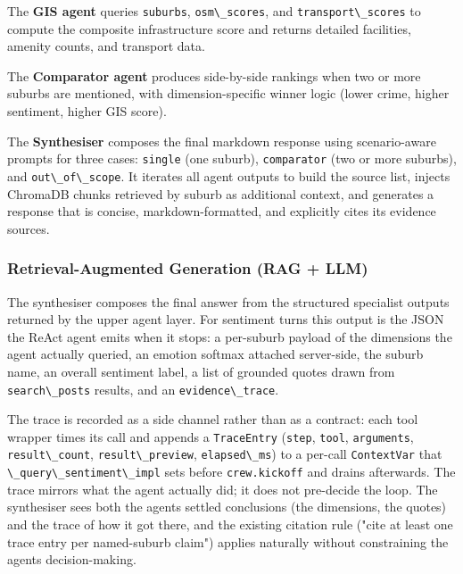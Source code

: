 \documentclass[11pt,a4paper]{article}
\newcommand{\passthrough}[1]{#1}
\begin{document}
The \textbf{GIS agent} queries \passthrough{\lstinline!suburbs!}, \passthrough{\lstinline!osm\_scores!}, and \passthrough{\lstinline!transport\_scores!} to compute the composite infrastructure score and returns detailed facilities, amenity counts, and transport data.

The \textbf{Comparator agent} produces side-by-side rankings when two or more suburbs are mentioned, with dimension-specific winner logic (lower crime, higher sentiment, higher GIS score).

The \textbf{Synthesiser} composes the final markdown response using scenario-aware prompts for three cases: \passthrough{\lstinline!single!} (one suburb), \passthrough{\lstinline!comparator!} (two or more suburbs), and \passthrough{\lstinline!out\_of\_scope!}. It iterates all agent outputs to build the source list, injects ChromaDB chunks retrieved by suburb as additional context, and generates a response that is concise, markdown-formatted, and explicitly cites its evidence sources.

\subsubsection{Retrieval-Augmented Generation (RAG + LLM)}\label{535-retrieval-augmented-generation-rag--llm}

The synthesiser composes the final answer from the structured specialist outputs returned by the upper agent layer. For sentiment turns this output is the JSON the ReAct agent emits when it stops: a per-suburb payload of the dimensions the agent actually queried, an emotion softmax attached server-side, the suburb name, an overall sentiment label, a list of grounded quotes drawn from \passthrough{\lstinline!search\_posts!} results, and an \passthrough{\lstinline!evidence\_trace!}.

The trace is recorded as a side channel rather than as a contract: each tool wrapper times its call and appends a \passthrough{\lstinline!TraceEntry!} (\passthrough{\lstinline!step!}, \passthrough{\lstinline!tool!}, \passthrough{\lstinline!arguments!}, \passthrough{\lstinline!result\_count!}, \passthrough{\lstinline!result\_preview!}, \passthrough{\lstinline!elapsed\_ms!}) to a per-call \passthrough{\lstinline!ContextVar!} that \passthrough{\lstinline!\_query\_sentiment\_impl!} sets before \passthrough{\lstinline!crew.kickoff!} and drains afterwards. The trace mirrors what the agent actually did; it does not pre-decide the loop. The synthesiser sees both the agent\textquotesingle s settled conclusions (the dimensions, the quotes) and the trace of how it got there, and the existing citation rule ("cite at least one trace entry per named-suburb claim") applies naturally without constraining the agent\textquotesingle s decision-making.
\end{document}

